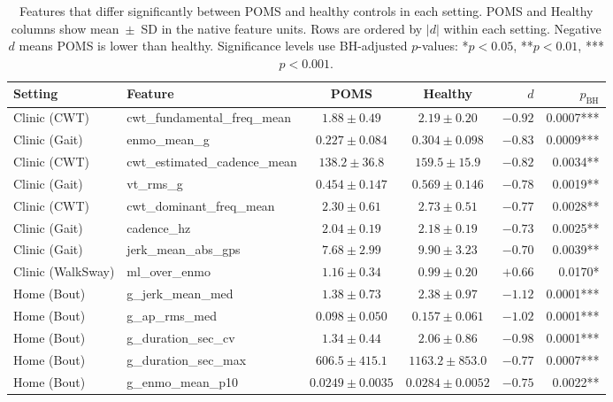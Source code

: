 \documentclass{article}
\begin{document}
\begin{table}[!t]
\centering
\caption{Features that differ significantly between POMS and healthy controls in each setting. POMS and Healthy columns show mean~$\pm$~SD in the native feature units. Rows are ordered by $|d|$ within each setting. Negative $d$ means POMS is lower than healthy. Significance levels use BH-adjusted $p$-values: *$p<0.05$, **$p<0.01$, ***$p<0.001$.}
\label{tab:mshealthy}
\footnotesize
\begin{tabular}{@{}llccrr@{}}
\toprule
Setting & Feature & POMS & Healthy & $d$ & $p_{\mathrm{BH}}$ \\
\midrule
Clinic (CWT)      & cwt\_fundamental\_freq\_mean  & $1.88 \pm 0.49$      & $2.19 \pm 0.20$      & $-0.92$ & 0.0007*** \\
Clinic (Gait)     & enmo\_mean\_g                 & $0.227 \pm 0.084$    & $0.304 \pm 0.098$    & $-0.83$ & 0.0009*** \\
Clinic (CWT)      & cwt\_estimated\_cadence\_mean & $138.2 \pm 36.8$     & $159.5 \pm 15.9$     & $-0.82$ & 0.0034** \\
Clinic (Gait)     & vt\_rms\_g                    & $0.454 \pm 0.147$    & $0.569 \pm 0.146$    & $-0.78$ & 0.0019** \\
Clinic (CWT)      & cwt\_dominant\_freq\_mean     & $2.30 \pm 0.61$      & $2.73 \pm 0.51$      & $-0.77$ & 0.0028** \\
Clinic (Gait)     & cadence\_hz                   & $2.04 \pm 0.19$      & $2.18 \pm 0.19$      & $-0.73$ & 0.0025** \\
Clinic (Gait)     & jerk\_mean\_abs\_gps          & $7.68 \pm 2.99$      & $9.90 \pm 3.23$      & $-0.70$ & 0.0039** \\
Clinic (WalkSway) & ml\_over\_enmo                & $1.16 \pm 0.34$      & $0.99 \pm 0.20$      & $+0.66$ & 0.0170* \\
\midrule
\addlinespace
Home (Bout)       & g\_jerk\_mean\_med            & $1.38 \pm 0.73$      & $2.38 \pm 0.97$      & $-1.12$ & 0.0001*** \\
Home (Bout)       & g\_ap\_rms\_med               & $0.098 \pm 0.050$    & $0.157 \pm 0.061$    & $-1.02$ & 0.0001*** \\
Home (Bout)       & g\_duration\_sec\_cv          & $1.34 \pm 0.44$      & $2.06 \pm 0.86$      & $-0.98$ & 0.0001*** \\
Home (Bout)       & g\_duration\_sec\_max         & $606.5 \pm 415.1$    & $1163.2 \pm 853.0$   & $-0.77$ & 0.0007*** \\
Home (Bout)       & g\_enmo\_mean\_p10            & $0.0249 \pm 0.0035$  & $0.0284 \pm 0.0052$  & $-0.75$ & 0.0022** \\

\end{tabular}
\end{table}
\end{document}
